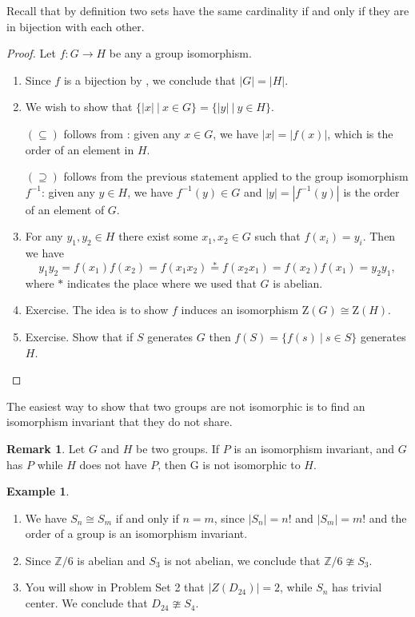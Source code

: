 \documentclass[12pt]{report}
\numberwithin{equation}{section}
\numberwithin{theorem}{chapter}
\theoremstyle{definition}
\newtheorem{example}[theorem]{Example}
\newtheorem*{basic properties}{Basic Properties}
\newtheorem*{Important Remark}{Important Remark}
\newtheorem{remark}[theorem]{Remark}
\begin{document}
Recall that by definition two sets have the same cardinality if and only if they are in bijection with each other.


\begin{proof}
Let $f\!:G\to H$ be any a group isomorphism.

\begin{enumerate}[leftmargin=20pt,label=(\alph*)]
\item Since $f$ is a bijection by , we conclude that $|G|=|H|$.

\item We wish to show that $\{|x| \ | \ x\in G\}= \{|y| \ | \ y\in H\}$. 

$(\subseteq)$ follows from : given any $x\in G$, we have $|x| = |f(x)|$, which is the order of an element in $H$.

$(\supseteq)$ follows from the previous statement applied to the group isomorphism $f^{-1}$: given any $y\in H$, we have $f^{-1}(y)\in G$ and $|y| = |f^{-1}(y)|$ is the order of an element of $G$.

\item For any $y_1,y_2\in H$ there exist some $x_1, x_2\in G$ such that $f(x_i)=y_i$. Then we have
$$y_1y_2=f(x_1)f(x_2)=f(x_1x_2)\stackrel{*}{=}f(x_2x_1)=f(x_2)f(x_1)=y_2y_1,$$
where $*$ indicates the place where we used that $G$ is abelian.
\item Exercise. The idea is to show $f$ induces an isomorphism $\mathrm{Z}(G)\cong \mathrm{Z}(H)$.
\item Exercise. Show that if $S$ generates $G$ then $f(S)=\{f(s) \ | \ s\in S\}$ generates $H$.\qedhere
\end{enumerate}
\end{proof}


The easiest way to show that two groups are not isomorphic is to find an isomorphism invariant that they do not share.

\begin{remark}
	Let $G$ and $H$ be two groups. If $P$ is an isomorphism invariant, and $G$ has $P$ while $H$ does not have $P$, then G is not isomorphic to $H$.
\end{remark}



\begin{example}$\,$
\begin{enumerate}
\item We have $S_n\cong S_m$ if and only if $n=m$, since $|S_n| = n!$ and $|S_m| = m!$ and the order of a group is an isomorphism invariant.
\item Since $\mathbb{Z}/6$ is abelian and $S_3$ is not abelian, we conclude that $\mathbb{Z}/6\ncong S_3$.
\item You will show in Problem Set 2 that $|Z(D_{24})|=2$, while $S_n$ has trivial center. We conclude that $D_{24}\ncong S_4$.
\end{enumerate}
\end{example}
\end{document}
